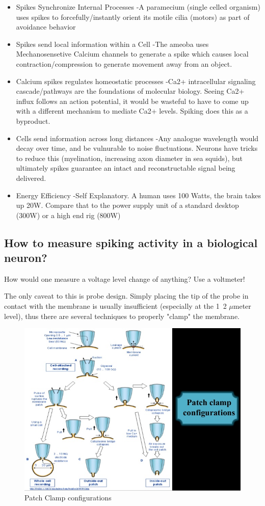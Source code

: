 \documentclass[main]{subfiles}
\begin{document}
\begin{itemize}
	\item Spikes Synchronize Internal Processes
	-A paramecium (single celled organism) uses spikes to forcefully/instantly orient its motile cilia (motors) as part of avoidance behavior 
	\item Spikes send local information within a Cell
	-The ameoba uses Mechanosensetive Calcium channels to generate a spike which causes local contraction/compression to generate movement away from an object.
	\item Calcium spikes regulates homeostatic processes
	-Ca2+ intracellular signaling cascade/pathways are the foundations of molecular biology. Seeing Ca2+ influx follows an action potential, it would be wasteful to have to come up with a different mechanism to mediate Ca2+ levels. Spiking does this as a byproduct.
	\item Cells send information across long distances
	-Any analogue wavelength would decay over time, and be vulnurable to noise fluctuations. Neurons have tricks to reduce this (myelination, increasing axon diameter in sea squids), but ultimately spikes guarantee an intact and reconstructable signal being delivered. 
	\item Energy Efficiency
	-Self Explanatory. A human uses 100 Watts, the brain takes up 20W. Compare that to the power supply unit of a standard desktop (300W) or a high end rig (800W)
\end{itemize}


\subsection{How to measure spiking activity in a biological neuron?}

How would one measure a voltage level change of anything? Use a voltmeter!

The only caveat to this is probe design. Simply placing the tip of the probe in contact with the membrane is usually insufficient (especially at the 1~2 $\mu$meter level), thus there are several techniques to properly "clamp" the membrane.

\begin{figure}[H]
	\centering
	\includegraphics[width=0.9\linewidth]{09_WhySpikes/figures/patch-clam-technique-10-638.jpg}
	\caption{Patch Clamp configurations}
\end{figure}
\end{document}
